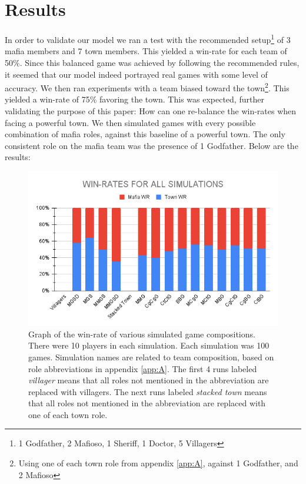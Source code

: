 \section{Results}\label{sec:results}
In order to validate our model we ran a test with the recommended 
setup\footnote[1]{1 Godfather, 2 Mafioso, 1 Sheriff, 1 Doctor, 5 Villagers} of 3
mafia members and 7 town members\cite{MafiaRules}. This yielded a win-rate for 
each team of 
50\%. Since this 
balanced game was achieved by following the recommended rules, it seemed that 
our model indeed portrayed real games with some level of accuracy. We then ran 
experiments with a team biased toward the town\footnote{Using one of each 
town 
role from appendix \ref{app:A}, against 1 Godfather, and 2 Mafioso}. This 
yielded a win-rate of 75\% favoring the town. This was expected, further 
validating the purpose of this paper: How can one re-balance the win-rates when 
facing a powerful town. We then simulated games with every possible combination 
of mafia roles, against this baseline of a powerful town. The only 
consistent role on the mafia team was the presence of 1 Godfather. Below are 
the results: 
\begin{figure}[h]
	\includegraphics[width=1\linewidth]{figures/Winrates}
	\caption{Graph of the win-rate of various simulated game compositions. 
	There were 10 players in each simulation. Each simulation was 100 games. 
	Simulation names are related to team composition, based on role 
	abbreviations in appendix \ref{app:A}. The first 4 runs labeled 
	\textit{villager} means that all roles not mentioned in the abbreviation 
	are replaced with villagers. The next runs labeled \textit{stacked town} 
	means that all roles not mentioned in the abbreviation are replaced with 
	one of each town role.}
	\label{fig:placeholder}
\end{figure}
